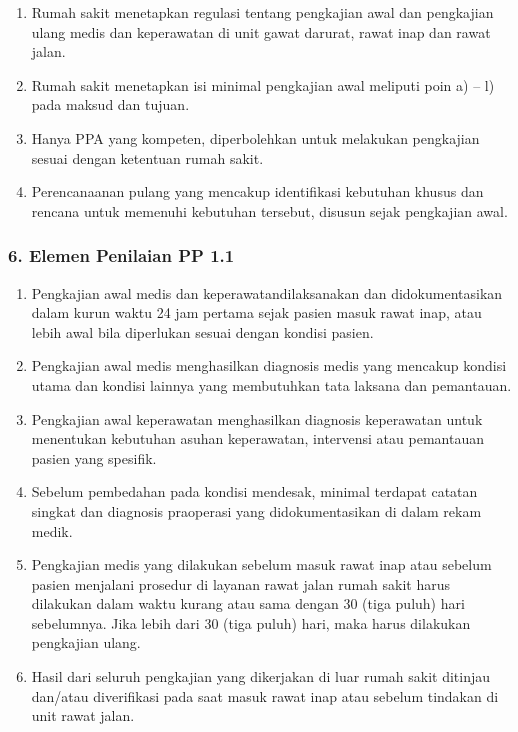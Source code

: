\documentclass[
]{book}
\providecommand{\tightlist}{%
  \setlength{\itemsep}{0pt}\setlength{\parskip}{0pt}}
\begin{document}
\begin{enumerate}
\def\labelenumi{\alph{enumi}.}
\tightlist
\item
  Rumah sakit menetapkan regulasi tentang pengkajian awal dan pengkajian ulang medis dan keperawatan di unit gawat darurat, rawat inap dan rawat jalan.
\item
  Rumah sakit menetapkan isi minimal pengkajian awal meliputi poin a) -- l) pada maksud dan tujuan.
\item
  Hanya PPA yang kompeten, diperbolehkan untuk melakukan pengkajian sesuai dengan ketentuan rumah sakit.
\item
  Perencanaanan pulang yang mencakup identifikasi kebutuhan khusus dan rencana untuk memenuhi kebutuhan tersebut, disusun sejak pengkajian awal.
\end{enumerate}

\hypertarget{elemen-penilaian-pp-1.1}{%
\subsubsection*{6. Elemen Penilaian PP 1.1}\label{elemen-penilaian-pp-1.1}}

\begin{enumerate}
\def\labelenumi{\alph{enumi}.}
\tightlist
\item
  Pengkajian awal medis dan keperawatandilaksanakan dan didokumentasikan dalam kurun waktu 24 jam pertama sejak pasien masuk rawat inap, atau lebih awal bila diperlukan sesuai dengan kondisi pasien.
\item
  Pengkajian awal medis menghasilkan diagnosis medis yang mencakup kondisi utama dan kondisi lainnya yang membutuhkan tata laksana dan pemantauan.
\item
  Pengkajian awal keperawatan menghasilkan diagnosis keperawatan untuk menentukan kebutuhan asuhan keperawatan, intervensi atau pemantauan pasien yang spesifik.
\item
  Sebelum pembedahan pada kondisi mendesak, minimal terdapat catatan singkat dan diagnosis praoperasi yang didokumentasikan di dalam rekam medik.
\item
  Pengkajian medis yang dilakukan sebelum masuk rawat inap atau sebelum pasien menjalani prosedur di layanan rawat jalan rumah sakit harus dilakukan dalam waktu kurang atau sama dengan 30 (tiga puluh) hari sebelumnya. Jika lebih dari 30 (tiga puluh) hari, maka harus dilakukan pengkajian ulang.
\item
  Hasil dari seluruh pengkajian yang dikerjakan di luar rumah sakit ditinjau dan/atau diverifikasi pada saat masuk rawat inap atau sebelum tindakan di unit rawat jalan.
\end{enumerate}
\end{document}
